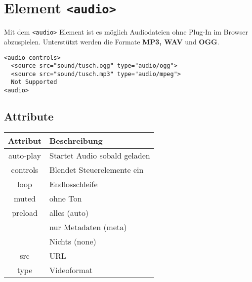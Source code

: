 \section{Element \texttt{<audio>}}
Mit dem \texttt{<audio>} Element ist es möglich Audiodateien ohne Plug-In im Browser abzuspielen. Unterstützt werden die Formate \textbf{MP3, WAV} und \textbf{OGG}.
\begin{lstlisting}[caption=''Audio'']
<audio controls>
  <source src="sound/tusch.ogg" type="audio/ogg">
  <source src="sound/tusch.mp3" type="audio/mpeg">
  Not Supported
<audio>
\end{lstlisting}
\subsection{Attribute}
\begin{tabular}{|c|l|}
\hline
\rowcolor{lstback}\textbf{Attribut}	&\textbf{Beschreibung}\\
\hline
auto-play		&Startet Audio sobald geladen\\
\hline
controls		&Blendet Steuerelemente ein\\
\hline
loop			&Endlosschleife\\
\hline
muted		&ohne Ton\\
\hline
preload		&alles (auto)\\
			&nur Metadaten (meta)\\
			&Nichts (none)\\
\hline
src			&URL\\
\hline
type			&Videoformat\\
\hline
\end{tabular}

